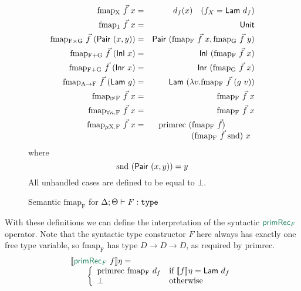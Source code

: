 \begin{figure}[t]
  \begin{eqnarray*}
    \mathrm{fmap_X}\ \vec{f}\ x & = & d_f(x)\quad (f_X = \semCons{Lam}\ d_f) \\
    \mathrm{fmap_1}\ \vec{f}\ x & = & \semCons{Unit} \\
    \mathrm{fmap_{F \times G}}\ \vec{f}\ (\semCons{Pair}\ (x,y)) & = & \semCons{Pair}\ (\mathrm{fmap_F}\ \vec{f}\ x, \mathrm{fmap_G}\ \vec{f}\ y) \\
    \mathrm{fmap_{F + G}}\ \vec{f}\ (\semCons{Inl}\ x) & = & \semCons{Inl}\ (\mathrm{fmap_F}\ \vec{f}\ x) \\
    \mathrm{fmap_{F + G}}\ \vec{f}\ (\semCons{Inr}\ x) & = & \semCons{Inr}\ (\mathrm{fmap_G}\ \vec{f}\ x) \\
    \mathrm{fmap_{A \to F}}\ \vec{f}\ (\semCons{Lam}\ g) & = & \semCons{Lam}\ (\lambda v. \mathrm{fmap_F}\ \vec{f}\ (g\ v)) \\
    \mathrm{fmap_{\delay\kappa F}}\ \vec{f}\ x & = & \mathrm{fmap_F}\ \vec{f}\ x \\
    \mathrm{fmap_{\forall\kappa.F}}\ \vec{f}\ x & = & \mathrm{fmap_F}\ \vec{f}\ x \\
    \mathrm{fmap_{\mu X. F}}\ \vec{f}\ x & = &
    \begin{array}[t]{@{}l}
      \mathrm{primrec}\ (\mathrm{fmap_F}\ \vec{f})\ \\
      \quad\quad\quad\quad(\mathrm{fmap_F}\ \vec{f}\ \mathrm{snd})\ x
    \end{array}
  \end{eqnarray*}
  where
  \begin{displaymath}
    \mathrm{snd}\ (\semCons{Pair}\ (x,y)) = y
  \end{displaymath}
  All unhandled cases are defined to be equal to $\bot$.
  \caption{Semantic $\mathrm{fmap_F}$ for $\Delta; \Theta \vdash F : \texttt{\textup{type}}$}
  \label{fig:semantic-fmap}
\end{figure}

With these definitions we can define the interpretation of the
syntactic $\elim{primRec$_F$}$ operator. Note that the syntactic type
constructor $F$ here always has exactly one free type variable, so
$\mathrm{fmap_F}$ has type $D \to D \to D$, as required by
$\mathrm{primrec}$.
\begin{displaymath}
  \begin{array}{l}
    \sem{\elim{primRec$_F$}\ f}\eta = \\
    \quad\quad\left\{
      \begin{array}{ll}
        \mathrm{primrec}\ \mathrm{fmap_F}\ d_f & \textrm{if }\sem{f}\eta = \semCons{Lam}\ d_f \\
        \bot & \textrm{otherwise}
      \end{array}
    \right.
  \end{array}
\end{displaymath}

